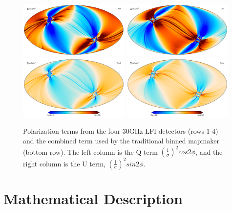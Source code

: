 \documentclass{aa}
\begin{document}
\begin{figure}
  \includegraphics[width=0.49\textwidth]{figs/map_Q_polang28S.pdf}
  \includegraphics[width=0.49\textwidth]{figs/map_U_polang28S.pdf}\\
  \includegraphics[width=0.49\textwidth]{figs/map_Q_polang_all.pdf}
  \includegraphics[width=0.49\textwidth]{figs/map_U_polang_all.pdf}\\
  \caption{Polarization terms from the four 30GHz LFI detectors (rows 1-4) and the combined term used by the traditional binned mapmaker (bottom row). The left column is the Q term $(\frac{1}{\sigma})^2 cos2\phi$, and the right column is the U term, $(\frac{1}{\sigma})^2 sin2\phi$.}
  \label{fig:polangles}
\end{figure}

\section{Mathematical Description}
\label{sec:mapmaking}
\end{document}
